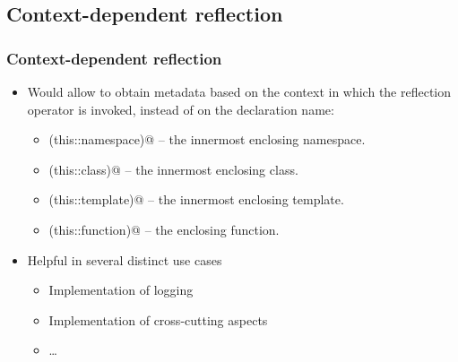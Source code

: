 \documentclass[compress,table,xcolor=table]{beamer}
\begin{document}
\subsection{Context-dependent reflection}
\begin{frame}[fragile]
\frametitle{Context-dependent reflection}
  \small
  \begin{itemize}
    \item Would allow to obtain metadata based on the context in which the
      reflection operator is invoked, instead of on the declaration name:
    \begin{itemize}
      \footnotesize
      \item \verb@reflexpr(this::namespace)@ -- the innermost enclosing namespace.
      \item \verb@reflexpr(this::class)@ -- the innermost enclosing class.
      \item \verb@reflexpr(this::template)@ -- the innermost enclosing template.
      \item \verb@reflexpr(this::function)@ -- the enclosing function.
    \end{itemize}
    \item Helpful in several distinct use cases
    \begin{itemize}
      \footnotesize
        \item Implementation of logging
        \item Implementation of cross-cutting aspects
        \item \ldots
    \end{itemize}
  \end{itemize}
\end{frame}
\end{document}

